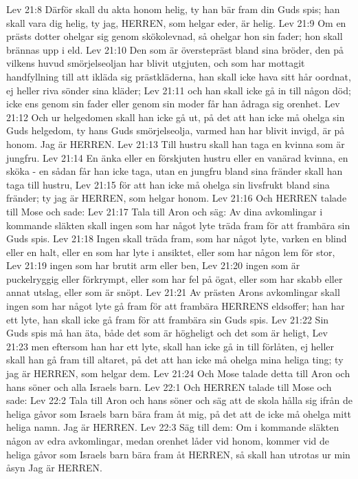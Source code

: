 Lev 21:8  Därför skall du akta honom helig, ty han bär fram din Guds spis; han skall vara dig helig, ty jag, HERREN, som helgar eder, är helig.
Lev 21:9  Om en prästs dotter ohelgar sig genom skökolevnad, så ohelgar hon sin fader; hon skall brännas upp i eld.
Lev 21:10  Den som är överstepräst bland sina bröder, den på vilkens huvud smörjelseoljan har blivit utgjuten, och som har mottagit handfyllning till att ikläda sig prästkläderna, han skall icke hava sitt hår oordnat, ej heller riva sönder sina kläder;
Lev 21:11  och han skall icke gå in till någon död; icke ens genom sin fader eller genom sin moder får han ådraga sig orenhet.
Lev 21:12  Och ur helgedomen skall han icke gå ut, på det att han icke må ohelga sin Guds helgedom, ty hans Guds smörjelseolja, varmed han har blivit invigd, är på honom. Jag är HERREN.
Lev 21:13  Till hustru skall han taga en kvinna som är jungfru.
Lev 21:14  En änka eller en förskjuten hustru eller en vanärad kvinna, en sköka - en sådan får han icke taga, utan en jungfru bland sina fränder skall han taga till hustru,
Lev 21:15  för att han icke må ohelga sin livsfrukt bland sina fränder; ty jag är HERREN, som helgar honom.
Lev 21:16  Och HERREN talade till Mose och sade:
Lev 21:17  Tala till Aron och säg: Av dina avkomlingar i kommande släkten skall ingen som har något lyte träda fram för att frambära sin Guds spis.
Lev 21:18  Ingen skall träda fram, som har något lyte, varken en blind eller en halt, eller en som har lyte i ansiktet, eller som har någon lem för stor,
Lev 21:19  ingen som har brutit arm eller ben,
Lev 21:20  ingen som är puckelryggig eller förkrympt, eller som har fel på ögat, eller som har skabb eller annat utslag, eller som är snöpt.
Lev 21:21  Av prästen Arons avkomlingar skall ingen som har något lyte gå fram för att frambära HERRENS eldsoffer; han har ett lyte, han skall icke gå fram för att frambära sin Guds spis.
Lev 21:22  Sin Guds spis må han äta, både det som är högheligt och det som är heligt,
Lev 21:23  men eftersom han har ett lyte, skall han icke gå in till förlåten, ej heller skall han gå fram till altaret, på det att han icke må ohelga mina heliga ting; ty jag är HERREN, som helgar dem.
Lev 21:24  Och Mose talade detta till Aron och hans söner och alla Israels barn.
Lev 22:1  Och HERREN talade till Mose och sade:
Lev 22:2  Tala till Aron och hans söner och säg att de skola hålla sig ifrån de heliga gåvor som Israels barn bära fram åt mig, på det att de icke må ohelga mitt heliga namn. Jag är HERREN.
Lev 22:3  Säg till dem: Om i kommande släkten någon av edra avkomlingar, medan orenhet låder vid honom, kommer vid de heliga gåvor som Israels barn bära fram åt HERREN, så skall han utrotas ur min åsyn Jag är HERREN.
